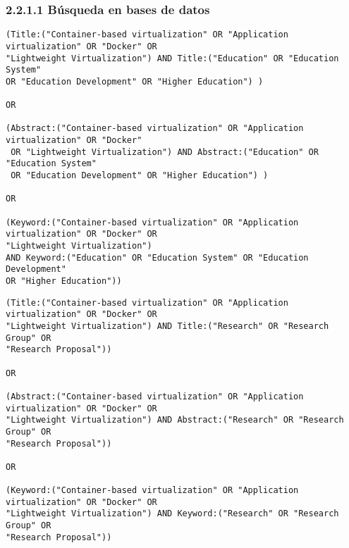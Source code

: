 




\subsubsection*{2.2.1.1 Búsqueda en bases de datos}
\label{par:busquedaBasesDatos}

\begin{tcolorbox}[
  colback=gray!5, 
  colframe=black!60, 
  title=Cadena de búsqueda en ACM para educación, 
  fonttitle=\bfseries, 
  sharp corners=south
]
\scriptsize %
\begin{verbatim}
(Title:("Container-based virtualization" OR "Application virtualization" OR "Docker" OR 
"Lightweight Virtualization") AND Title:("Education" OR "Education System" 
OR "Education Development" OR "Higher Education") ) 

OR

(Abstract:("Container-based virtualization" OR "Application virtualization" OR "Docker"
 OR "Lightweight Virtualization") AND Abstract:("Education" OR "Education System" 
 OR "Education Development" OR "Higher Education") )

OR

(Keyword:("Container-based virtualization" OR "Application virtualization" OR "Docker" OR 
"Lightweight Virtualization")
AND Keyword:("Education" OR "Education System" OR "Education Development" 
OR "Higher Education"))
\end{verbatim}
\end{tcolorbox}

\begin{tcolorbox}[
  colback=gray!5, 
  colframe=black!60, 
  title=Cadena de búsqueda en ACM para investigación, 
  fonttitle=\bfseries, 
  sharp corners=south
]
\scriptsize %
\begin{verbatim}
(Title:("Container-based virtualization" OR "Application virtualization" OR "Docker" OR 
"Lightweight Virtualization") AND Title:("Research" OR "Research Group" OR 
"Research Proposal"))

OR

(Abstract:("Container-based virtualization" OR "Application virtualization" OR "Docker" OR 
"Lightweight Virtualization") AND Abstract:("Research" OR "Research Group" OR 
"Research Proposal"))

OR

(Keyword:("Container-based virtualization" OR "Application virtualization" OR "Docker" OR 
"Lightweight Virtualization") AND Keyword:("Research" OR "Research Group" OR 
"Research Proposal"))
\end{verbatim}
\end{tcolorbox}

